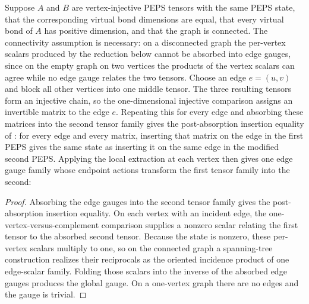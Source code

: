 \begin{theorem}%
    \label{thm:gaugeConsistency}
    \leanok
    Suppose $A$ and $B$ are vertex-injective PEPS tensors with the same PEPS
    state, that the corresponding virtual bond dimensions are equal, that
    every virtual bond of $A$ has positive dimension, and that the graph is
    connected. The connectivity assumption is necessary: on a disconnected
    graph the per-vertex scalars produced by the reduction below cannot be
    absorbed into edge gauges, since on the empty graph on two vertices the
    products of the vertex scalars can agree while no edge gauge relates the two
    tensors.
    Choose an edge $e=(u,v)$ and block all other vertices into one middle
    tensor. The three resulting tensors form an injective chain, so the
    one-dimensional injective comparison assigns an invertible matrix to the
    edge $e$. Repeating this for every edge and absorbing these matrices into
    the second tensor family gives the post-absorption insertion equality of
    \cite[Section~3]{Molnar2018NormalPEPS}: for every edge and every matrix,
    inserting that matrix on the edge in the first PEPS gives the same state as
    inserting it on the same edge in the modified second PEPS. Applying the
    local extraction at each vertex then gives one edge gauge family whose
    endpoint actions transform the first tensor family into the second:
    \begin{center}
        \TNPEPSGlobalConsistency
    \end{center}
\end{theorem}
\begin{proof}\leanok
    Absorbing the edge gauges into the second tensor family gives the
    post-absorption insertion equality. On each vertex with an incident edge,
    the one-vertex-versus-complement comparison supplies a nonzero scalar
    relating the first tensor to the absorbed second tensor. Because the state
    is nonzero, these per-vertex scalars multiply to one, so on the connected
    graph a spanning-tree construction realizes their reciprocals as the
    oriented incidence product of one edge-scalar family. Folding those scalars
    into the inverse of the absorbed edge gauges produces the global gauge. On a
    one-vertex graph there are no edges and the gauge is trivial.
\end{proof}

